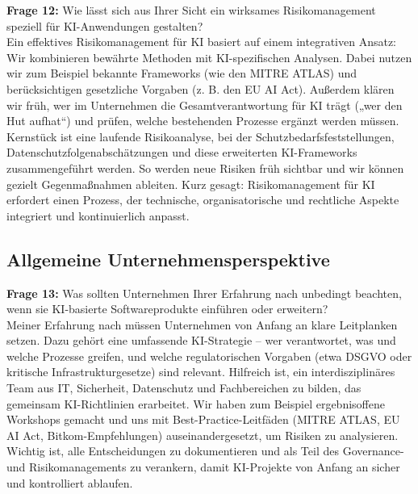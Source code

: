 \documentclass[
    12pt, 
    a4paper,
    ]{scrartcl} %
\begin{document}
\textbf{Frage 12:} Wie lässt sich aus Ihrer Sicht ein wirksames Risikomanagement speziell für KI-Anwendungen gestalten? \\[0.5em]
Ein effektives Risikomanagement für KI basiert auf einem integrativen Ansatz: Wir kombinieren bewährte Methoden mit KI-spezifischen Analysen. Dabei nutzen wir zum Beispiel bekannte Frameworks (wie den MITRE ATLAS) und berücksichtigen gesetzliche Vorgaben (z. B. den EU AI Act). Außerdem klären wir früh, wer im Unternehmen die Gesamtverantwortung für KI trägt („wer den Hut aufhat“) und prüfen, welche bestehenden Prozesse ergänzt werden müssen. Kernstück ist eine laufende Risikoanalyse, bei der Schutzbedarfsfeststellungen, Datenschutzfolgenabschätzungen und diese erweiterten KI-Frameworks zusammengeführt werden. So werden neue Risiken früh sichtbar und wir können gezielt Gegenmaßnahmen ableiten. Kurz gesagt: Risikomanagement für KI erfordert einen Prozess, der technische, organisatorische und rechtliche Aspekte integriert und kontinuierlich anpasst.

\subsection*{Allgemeine Unternehmensperspektive}

\textbf{Frage 13:} Was sollten Unternehmen Ihrer Erfahrung nach unbedingt beachten, wenn sie KI-basierte Softwareprodukte einführen oder erweitern? \\[0.5em]
Meiner Erfahrung nach müssen Unternehmen von Anfang an klare Leitplanken setzen. Dazu gehört eine umfassende KI-Strategie – wer verantwortet, was und welche Prozesse greifen, und welche regulatorischen Vorgaben (etwa DSGVO oder kritische Infrastrukturgesetze) sind relevant. Hilfreich ist, ein interdisziplinäres Team aus IT, Sicherheit, Datenschutz und Fachbereichen zu bilden, das gemeinsam KI-Richtlinien erarbeitet. Wir haben zum Beispiel ergebnisoffene Workshops gemacht und uns mit Best-Practice-Leitfäden (MITRE ATLAS, EU AI Act, Bitkom-Empfehlungen) auseinandergesetzt, um Risiken zu analysieren. Wichtig ist, alle Entscheidungen zu dokumentieren und als Teil des Governance- und Risikomanagements zu verankern, damit KI-Projekte von Anfang an sicher und kontrolliert ablaufen.
\end{document}
